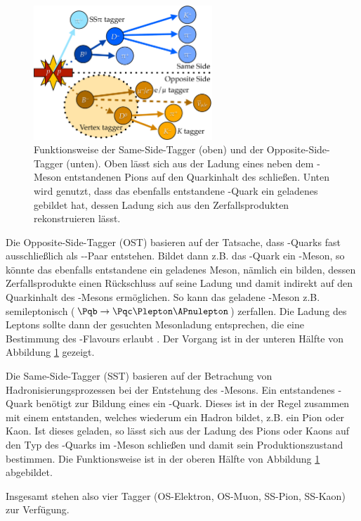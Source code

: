 \begin{figure}
  \centering
  \includegraphics[width=0.6\textwidth]{figures/tagging.pdf}
  \caption{Funktionsweise der Same-Side-Tagger (oben) und der Opposite-Side-Tagger (unten). Oben lässt sich aus der Ladung eines neben dem \PB-Meson entstandenen Pions auf den Quarkinhalt des \PB schließen. Unten wird genutzt, dass das ebenfalls entstandene \Pqb-Quark ein geladenes \PBm gebildet hat, dessen Ladung sich aus den Zerfallsprodukten rekonstruieren lässt.}
  \label{tagging}
\end{figure}

Die Opposite-Side-Tagger (OST) basieren auf der Tatsache, dass \Pqb-Quarks fast ausschließlich als \Pqb-\Paqb-Paar entstehen. Bildet dann z.B. das \Pqb-Quark ein \PaB-Meson, so könnte das ebenfalls entstandene \Paqb ein geladenes Meson, nämlich ein \PBp bilden, dessen Zerfallsprodukte einen Rückschluss auf seine Ladung und damit indirekt auf den Quarkinhalt des \PaBz-Mesons ermöglichen.
So kann das geladene \PB-Meson z.B. semileptonisch ($\Pqb \to \Pqc \Plepton \APnulepton$) zerfallen. Die Ladung des Leptons sollte dann der gesuchten Mesonladung entsprechen, die eine Bestimmung des \PB-Flavours erlaubt \cite{ost}.
Der Vorgang ist in der unteren Hälfte von Abbildung \ref{tagging} gezeigt.

Die Same-Side-Tagger (SST) basieren auf der Betrachung von Hadronisierungsprozessen bei der Entstehung des \PB-Mesons.
Ein entstandenes \Pqb-Quark benötigt zur Bildung eines \PaBz ein \APqd-Quark.
Dieses ist in der Regel zusammen mit einem \Pqd entstanden, welches wiederum ein Hadron bildet, z.B. ein Pion oder Kaon.
Ist dieses geladen, so lässt sich aus der Ladung des Pions oder Kaons auf den Typ des \Pqd-Quarks im \PB-Meson schließen und damit sein Produktionszustand bestimmen.
Die Funktionsweise ist in der oberen Hälfte von Abbildung \ref{tagging} abgebildet.

Insgesamt stehen also vier Tagger (OS-Elektron, OS-Muon, SS-Pion, SS-Kaon) zur Verfügung.

